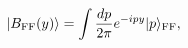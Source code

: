 \begin{equation}
 | B_{\rm FF}(y) \rangle
 = \int {{dp} \over {2\pi}} e^{-i p y} | p \rangle_{\rm FF},
\label{B_FF}
\end{equation}


